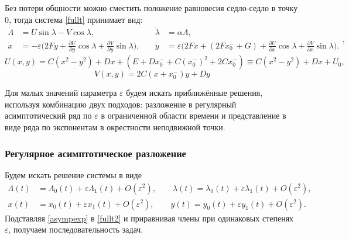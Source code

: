 Без потери общности можно сместить положение равновесия седло-седло в точку 0, тогда система \eqref{fullt} принимает вид:
\begin{equation}
    \begin{aligned}
        \dot{\Lambda} &= U \sin \lambda - V \cos \lambda,
        &\quad
        \dot{\lambda} &= \alpha \Lambda, \\[1.5ex]
        \dot{x} &= -\varepsilon \big( 2Fy + \frac{\partial U}{\partial y} \cos \lambda + \frac{\partial V}{\partial y} \sin \lambda \big),
        &\quad
        \dot{y} &= \varepsilon \big( 2Fx + (2Fx_0^- + G) + \frac{\partial U}{\partial x} \cos \lambda + \frac{\partial V}{\partial x} \sin \lambda \big).
    \end{aligned},
    \label{fullt2}
\end{equation}
$$U(x,y) = C(x^2-y^2) +Dx + \left(E+Dx_0^-+C(x_0^-)^2+2Cx_0^- \right) \equiv C(x^2-y^2) +Dx + U_0,$$
$$V(x,y) = 2C(x+x_0^-)y + Dy$$

Для малых значений параметра $\varepsilon$ будем искать приближённые решения, используя комбинацию двух подходов: разложение в регулярный асимптотический ряд по $\varepsilon$ в ограниченной области времени и представление в виде ряда по экспонентам в окрестности неподвижной точки.

\subsubsection{Регулярное асимптотическое разложение}

Будем искать решение системы в виде
\begin{equation}
    \begin{aligned}
        \Lambda(t) &= \Lambda_0(t) + \varepsilon \Lambda_1(t) + O(\varepsilon^2), \qquad
        \lambda(t) = \lambda_0(t) + \varepsilon \lambda_1(t) + O(\varepsilon^2), \\[1ex]
        x(t) &= x_0(t) + \varepsilon x_1(t) + O(\varepsilon^2), \qquad
        y(t) = y_0(t) + \varepsilon y_1(t) + O(\varepsilon^2).
    \end{aligned}
    \label{asympexp}
\end{equation}
Подставляя \eqref{asympexp} в \eqref{fullt2} и приравнивая члены при одинаковых степенях $\varepsilon$, получаем последовательность задач.


